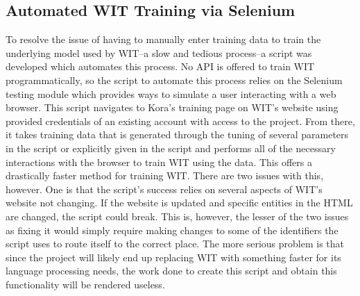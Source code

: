 \documentclass[onecolumn, draftclsnofoot,10pt, compsoc]{IEEEtran}
\begin{document}
    \subsection{Automated WIT Training via Selenium}
    To resolve the issue of having to manually enter training data to train the underlying model used by WIT--a slow and tedious process--a script was developed which automates this process.
    No API is offered to train WIT programmatically, so the script to automate this process relies on the Selenium testing module which provides ways to simulate a user interacting with a web browser.
    This script navigates to Kora’s training page on WIT’s website using provided credentials of an existing account with access to the project.
    From there, it takes training data that is generated through the tuning of several parameters in the script or explicitly given in the script and performs all of the necessary interactions with the browser to train WIT using the data.
    This offers a drastically faster method for training WIT.
    There are two issues with this, however.
    One is that the script’s success relies on several aspects of WIT’s website not changing.
    If the website is updated and specific entities in the HTML are changed, the script could break.
    This is, however, the lesser of the two issues as fixing it would simply require making changes to some of the identifiers the script uses to route itself to the correct place.
    The more serious problem is that since the project will likely end up replacing WIT with something faster for its language processing needs, the work done to create this script and obtain this functionality will be rendered useless.

 
\end{document}
